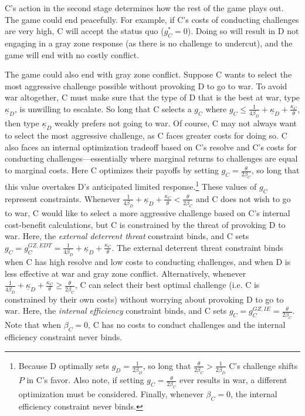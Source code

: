 \documentclass[11pt,letterpaper,pdftex,dvipsnames,table]{article}
\begin{document}
C's action in the second stage determines how the rest of the game plays out. The game could end peacefully. For example, if C's costs of conducting challenges are very high, C will accept the status quo ($g_{C}^{*}=0$). Doing so will result in D not engaging in a gray zone response (as there is no challenge to undercut), and the game will end with no costly conflict.

The game could also end with gray zone conflict. Suppose C wants to select the most aggressive challenge possible without provoking D to go to war. To avoid war altogether, C must make sure that the type of D that is the best at war, type $\underline{\kappa}_{D}$, is unwilling to escalate. So long that C selects a $g_{C}$ where $g_{C}\leq\frac{1}{4\beta_{D}}+\underline{\kappa}_{D}+\frac{\kappa_{C}}{\theta}$, then type $\underline{\kappa}_{D}$ weakly prefers not going to war. Of course, C may not always want to select the most aggressive challenge, as C faces greater costs for doing so. C also faces an internal optimization tradeoff based on C's resolve and C's costs for conducting challenges---essentially where  marginal returns to challenges are equal to marginal costs. Here C optimizes their payoffs by setting $g_{C}=\frac{\theta}{2\beta_{C}}$, so long that this value overtakes D's anticipated limited response.\footnote{Because D optimally sets $g_{D}=\frac{1}{2\beta_{D}}$, so long that $\frac{\theta}{2\beta_{C}}>\frac{1}{2\beta_{D}}$ C's challenge shifts $P$ in C's favor. Also note, if setting $g_{C}=\frac{\theta}{2\beta_{C}}$ ever results in war, a different optimization must be considered. Finally, whenever $\beta_{C}=0$, the internal efficiency constraint never binds.} These values of $g_{C}$ represent constraints. Whenever $\frac{1}{4\beta_{D}}+\underline{\kappa}_{D}+\frac{\kappa_{C}}{\theta}<\frac{\theta}{2\beta_{C}}$ and C does not wish to go to war, C would like to select a more aggressive challenge based on C's internal cost-benefit calculations, but C is constrained by the threat of provoking D to war. Here, the \textit{external deterrent threat} constraint binds, and C sets  $g_{C}=g_{C}^{GZ,EDT}=\frac{1}{4\beta_{D}}+\underline{\kappa}_{D}+\frac{\kappa_{C}}{\theta}$. The external deterrent threat constraint binds when C has high resolve and low costs to conducting challenges, and when D is less effective at war and gray zone conflict. Alternatively, whenever $\frac{1}{4\beta_{D}}+\underline{\kappa}_{D}+\frac{\kappa_{C}}{\theta}\geq\frac{\theta}{2\beta_{C}}$, C can select their best optimal challenge (i.e. C is constrained by their own costs) without worrying about provoking D to go to war. Here, the \textit{internal efficiency} constraint binds, and C sets $g_{C}=g_{C}^{GZ,IE}=\frac{\theta}{2\beta_{C}}$. Note that when $\beta_C=0$, C has no costs to conduct challenges and the internal efficiency constraint never binds.
\end{document}
